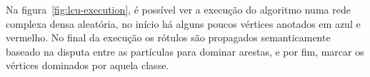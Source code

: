 \begin{figure}[!h]
\centering
    \captionsetup{width=14cm}

    \begin{subfigure}[b]{0.45\textwidth}
    \centering
    \caption{\label{fig:lcu-partial}}
    \end{subfigure}
\quad
    \begin{subfigure}[b]{0.45\textwidth}
    \centering
    \caption{\label{fig:lcu-done}}
    \end{subfigure}
    {\Fonte{\fonteautor}}
\quad
\end{figure}
\FloatBarrier{}


Na figura~\ref{fig:lcu-execution}, é possível ver a execução do
algoritmo numa rede complexa densa aleatória, no início há alguns
poucos vértices anotados em azul e vermelho. No final da execução os
rótulos são propagados semanticamente baseado na disputa entre as
partículas para dominar arestas, e por fim, marcar os vértices
dominados por aquela classe.

